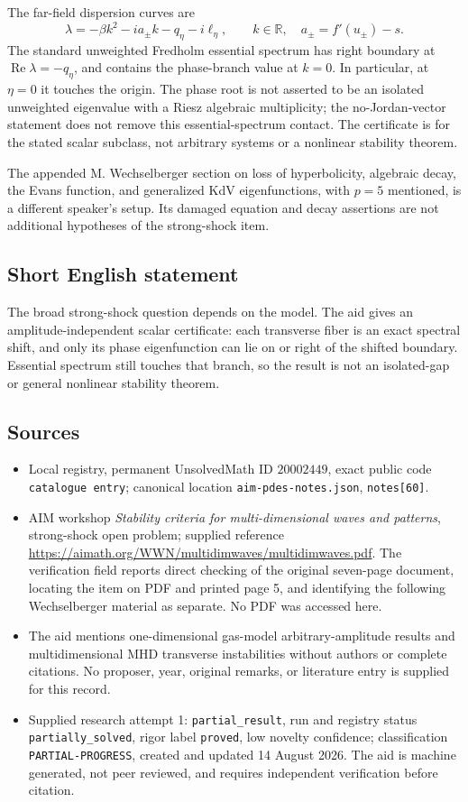 \documentclass[11pt]{article}
\newcommand{\R}{\mathbb{R}}
\begin{document}
The far-field dispersion curves are
\[
 \lambda=-\beta k^2-i a_\pm k-q_\eta-i\ell_\eta,
 \qquad k\in\R,\quad a_\pm=f'(u_\pm)-s.
\]
The standard unweighted Fredholm essential spectrum has right boundary at \(\operatorname{Re}\lambda=-q_\eta\), and contains the phase-branch value at \(k=0\). In particular, at \(\eta=0\) it touches the origin. The phase root is not asserted to be an isolated unweighted eigenvalue with a Riesz algebraic multiplicity; the no-Jordan-vector statement does not remove this essential-spectrum contact. The certificate is for the stated scalar subclass, not arbitrary systems or a nonlinear stability theorem.

The appended M. Wechselberger section on loss of hyperbolicity, algebraic decay, the Evans function, and generalized KdV eigenfunctions, with \(p=5\) mentioned, is a different speaker's setup. Its damaged equation and decay assertions are not additional hypotheses of the strong-shock item.
\subsection{Short English statement}
The broad strong-shock question depends on the model. The aid gives an amplitude-independent scalar certificate: each transverse fiber is an exact spectral shift, and only its phase eigenfunction can lie on or right of the shifted boundary. Essential spectrum still touches that branch, so the result is not an isolated-gap or general nonlinear stability theorem.
\subsection{Sources}
\begin{itemize}
\item Local registry, permanent UnsolvedMath ID \(20002449\), exact public code \texttt{catalogue entry}; canonical location \texttt{aim-pdes-notes.json}, \texttt{notes[60]}.
\item AIM workshop \emph{Stability criteria for multi-dimensional waves and patterns}, strong-shock open problem; supplied reference \url{https://aimath.org/WWN/multidimwaves/multidimwaves.pdf}. The verification field reports direct checking of the original seven-page document, locating the item on PDF and printed page 5, and identifying the following Wechselberger material as separate. No PDF was accessed here.
\item The aid mentions one-dimensional gas-model arbitrary-amplitude results and multidimensional MHD transverse instabilities without authors or complete citations. No proposer, year, original remarks, or literature entry is supplied for this record.
\item Supplied research attempt 1: \texttt{partial\_result}, run and registry status \texttt{partially\_solved}, rigor label \texttt{proved}, low novelty confidence; classification \texttt{PARTIAL-PROGRESS}, created and updated 14 August 2026. The aid is machine generated, not peer reviewed, and requires independent verification before citation.
\end{itemize}
\end{document}

